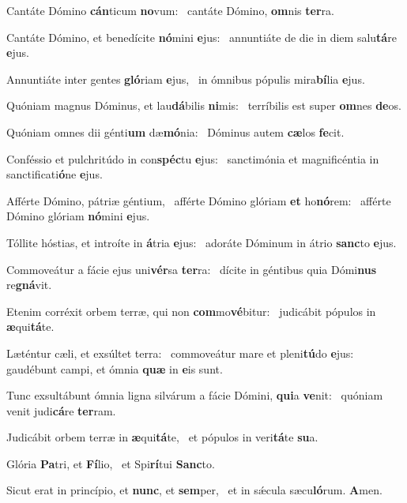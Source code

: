 \item Cantáte Dómino \textbf{cán}ticum \textbf{no}vum:~\psstar{} cantáte Dómino, \textbf{om}nis \textbf{ter}ra.
\item Cantáte Dómino, et benedícite \textbf{nó}mini \textbf{e}jus:~\psstar{} annuntiáte de die in diem salu\textbf{tá}re \textbf{e}jus.
\item Annuntiáte inter gentes \textbf{gló}riam \textbf{e}jus,~\psstar{} in ómnibus pópulis mira\textbf{bí}lia \textbf{e}jus.
\item Quóniam magnus Dóminus, et lau\textbf{dá}bilis \textbf{ni}mis:~\psstar{} terríbilis est super \textbf{om}nes \textbf{de}os.
\item Quóniam omnes dii génti\textbf{um} dæ\textbf{mó}nia:~\psstar{} Dóminus autem \textbf{cæ}los \textbf{fe}cit.
\item Conféssio et pulchritúdo in con\textbf{spéc}tu \textbf{e}jus:~\psstar{} sanctimónia et magnificéntia in sanctificati\textbf{ó}ne \textbf{e}jus.
\item Afférte Dómino, pátriæ géntium,~\pscross{} afférte Dómino glóriam \textbf{et} ho\textbf{nó}rem:~\psstar{} afférte Dómino glóriam \textbf{nó}mini \textbf{e}jus.
\item Tóllite hóstias, et introíte in \textbf{á}tria \textbf{e}jus:~\psstar{} adoráte Dóminum in átrio \textbf{sanc}to \textbf{e}jus.
\item Commoveátur a fácie ejus uni\textbf{vér}sa \textbf{ter}ra:~\psstar{} dícite in géntibus quia Dómi\textbf{nus} re\textbf{gná}vit.
\item Etenim corréxit orbem terræ, qui non \textbf{com}mo\textbf{vé}bitur:~\psstar{} judicábit pópulos in \textbf{æ}qui\textbf{tá}te.
\item Læténtur cæli, et exsúltet terra:~\pscross{} commoveátur mare et pleni\textbf{tú}do \textbf{e}jus:~\psstar{} gaudébunt campi, et ómnia \textbf{quæ} in \textbf{e}is sunt.
\item Tunc exsultábunt ómnia ligna silvárum a fácie Dómini, \textbf{qui}a \textbf{ve}nit:~\psstar{} quóniam venit judi\textbf{cá}re \textbf{ter}ram.
\item Judicábit orbem terræ in \textbf{æ}qui\textbf{tá}te,~\psstar{} et pópulos in veri\textbf{tá}te \textbf{su}a.
\item Glória \textbf{Pa}tri, et \textbf{Fí}lio,~\psstar{} et Spi\textbf{rí}tui \textbf{Sanc}to.
\item Sicut erat in princípio, et \textbf{nunc}, et \textbf{sem}per,~\psstar{} et in sǽcula sæcu\textbf{ló}rum. \textbf{A}men.
